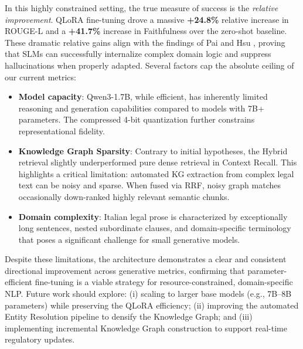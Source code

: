 \documentclass[11pt,a4paper]{article}
\begin{document}
In this highly constrained setting, the true measure of success is the \textit{relative improvement}. QLoRA fine-tuning drove a massive \textbf{+24.8\%} relative increase in ROUGE-L and a \textbf{+41.7\%} increase in Faithfulness over the zero-shot baseline. These dramatic relative gains align with the findings of Pai and Hsu \cite{pai2026finetuning}, proving that SLMs can successfully internalize complex domain logic and suppress hallucinations when properly adapted. Several factors cap the absolute ceiling of our current metrics:
\begin{itemize}
    \item \textbf{Model capacity}: Qwen3-1.7B, while efficient, has inherently limited reasoning and generation capabilities compared to models with 7B+ parameters. The compressed 4-bit quantization further constrains representational fidelity.
    \item \textbf{Knowledge Graph Sparsity}: Contrary to initial hypotheses, the Hybrid retrieval slightly underperformed pure dense retrieval in Context Recall. This highlights a critical limitation: automated KG extraction from complex legal text can be noisy and sparse. When fused via RRF, noisy graph matches occasionally down-ranked highly relevant semantic chunks.
    \item \textbf{Domain complexity}: Italian legal prose is characterized by exceptionally long sentences, nested subordinate clauses, and domain-specific terminology that poses a significant challenge for small generative models.
\end{itemize}

Despite these limitations, the architecture demonstrates a clear and consistent directional improvement across generative metrics, confirming that parameter-efficient fine-tuning is a viable strategy for resource-constrained, domain-specific NLP. Future work should explore: (i) scaling to larger base models (e.g., 7B--8B parameters) while preserving the QLoRA efficiency; (ii) improving the automated Entity Resolution pipeline to densify the Knowledge Graph; and (iii) implementing incremental Knowledge Graph construction to support real-time regulatory updates.



\end{document}
